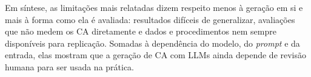 Em síntese, as limitações mais relatadas dizem respeito menos à geração em si e mais à forma como ela é avaliada: resultados difíceis de generalizar, avaliações que não medem os CA diretamente e dados e procedimentos nem sempre disponíveis para replicação. Somadas à dependência do modelo, do \textit{prompt} e da entrada, elas mostram que a geração de CA com LLMs ainda depende de revisão humana para ser usada na prática.
